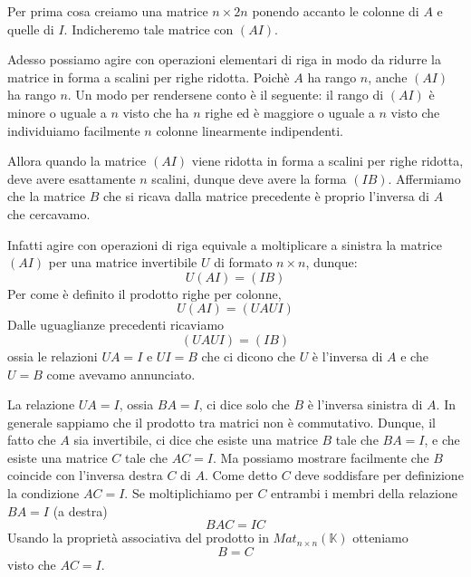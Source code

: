 Per prima cosa creiamo una matrice $n \times 2n$ ponendo accanto le colonne di $A$
e quelle di $I$. Indicheremo tale matrice con $(A I)$.

Adesso possiamo agire con operazioni elementari di riga in modo da ridurre la
matrice in forma a scalini per righe ridotta. Poich\`e $A$ ha rango $n$, anche
$(A I)$ ha rango $n$. Un modo per rendersene conto \`e il seguente: il rango di
$(A I)$ \`e minore o uguale a $n$ visto che ha $n$ righe ed \`e maggiore o uguale
a $n$ visto che individuiamo facilmente $n$ colonne linearmente indipendenti.

Allora quando la matrice $(A I)$ viene ridotta in forma a scalini per righe ridotta,
deve avere esattamente $n$ scalini, dunque deve avere la forma $(I B)$.
Affermiamo che la matrice $B$ che si ricava dalla matrice precedente \`e proprio
l'inversa di $A$ che cercavamo.

Infatti agire con operazioni di riga equivale a moltiplicare a sinistra la matrice
$(A I)$ per una matrice invertibile $U$ di formato $n \times n$, dunque:
\begin{equation*}
	U (A I) = (I B)
\end{equation*}
Per come \`e definito il prodotto righe per colonne,
\begin{equation*}
	U (A I) = (U A U I)
\end{equation*}
Dalle uguaglianze precedenti ricaviamo
\begin{equation*}
	(U A U I) = (I B)
\end{equation*}
ossia le relazioni $U A = I$ e $U I = B$ che ci dicono che $U$ \`e l'inversa di
$A$ e che $U = B$ come avevamo annunciato.

\begin{observation}
	La relazione $U A = I$, ossia $BA = I$, ci dice solo che $B$ \`e l'inversa
	sinistra di $A$. In generale sappiamo che il prodotto tra matrici non \`e
	commutativo. Dunque, il fatto che $A$ sia invertibile, ci dice che esiste una
	matrice $B$ tale che $BA = I$, e che esiste una matrice $C$ tale che $AC = I$.
	Ma possiamo mostrare facilmente che $B$ coincide con l'inversa destra $C$ di
	$A$. Come detto $C$ deve soddisfare per definizione la condizione $AC = I$.
	Se moltiplichiamo per $C$ entrambi i membri della relazione $BA = I$ (a destra)
	\[ BAC = IC \] Usando la propriet\`a associativa del prodotto in
	$Mat_{n \times n}(\mathbb{K})$ otteniamo \[B = C\] visto che $AC = I$.
\end{observation}